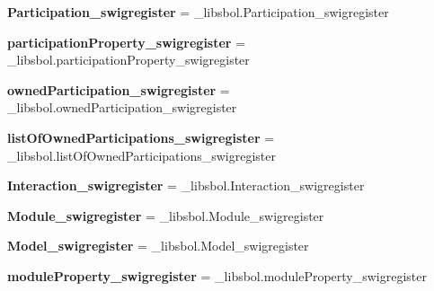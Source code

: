\begin{DoxyCompactItemize}
\item 
{\bfseries Participation\+\_\+swigregister} = \+\_\+libsbol.\+Participation\+\_\+swigregister\hypertarget{namespacesbol_1_1libsbol_adc117255c9c44b1ac337a87ce1a45afb}{}\label{namespacesbol_1_1libsbol_adc117255c9c44b1ac337a87ce1a45afb}

\item 
{\bfseries participation\+Property\+\_\+swigregister} = \+\_\+libsbol.\+participation\+Property\+\_\+swigregister\hypertarget{namespacesbol_1_1libsbol_aba7a86ced827b633feb3ff2c2be8a6bf}{}\label{namespacesbol_1_1libsbol_aba7a86ced827b633feb3ff2c2be8a6bf}

\item 
{\bfseries owned\+Participation\+\_\+swigregister} = \+\_\+libsbol.\+owned\+Participation\+\_\+swigregister\hypertarget{namespacesbol_1_1libsbol_a3a3b7b9f66d317530311d9ea5b96c011}{}\label{namespacesbol_1_1libsbol_a3a3b7b9f66d317530311d9ea5b96c011}

\item 
{\bfseries list\+Of\+Owned\+Participations\+\_\+swigregister} = \+\_\+libsbol.\+list\+Of\+Owned\+Participations\+\_\+swigregister\hypertarget{namespacesbol_1_1libsbol_aa580d9c040d9659045d3f4065330fd37}{}\label{namespacesbol_1_1libsbol_aa580d9c040d9659045d3f4065330fd37}

\item 
{\bfseries Interaction\+\_\+swigregister} = \+\_\+libsbol.\+Interaction\+\_\+swigregister\hypertarget{namespacesbol_1_1libsbol_a7bc91e84cf3086e8faf5b62c637ee742}{}\label{namespacesbol_1_1libsbol_a7bc91e84cf3086e8faf5b62c637ee742}

\item 
{\bfseries Module\+\_\+swigregister} = \+\_\+libsbol.\+Module\+\_\+swigregister\hypertarget{namespacesbol_1_1libsbol_a4ce2679f1565318af3844c0b0d852838}{}\label{namespacesbol_1_1libsbol_a4ce2679f1565318af3844c0b0d852838}

\item 
{\bfseries Model\+\_\+swigregister} = \+\_\+libsbol.\+Model\+\_\+swigregister\hypertarget{namespacesbol_1_1libsbol_ace5334205fc1ee9bc0004487fda7f176}{}\label{namespacesbol_1_1libsbol_ace5334205fc1ee9bc0004487fda7f176}

\item 
{\bfseries module\+Property\+\_\+swigregister} = \+\_\+libsbol.\+module\+Property\+\_\+swigregister\hypertarget{namespacesbol_1_1libsbol_aa514e72ca35ccc89cfce8c3129fd2414}{}\label{namespacesbol_1_1libsbol_aa514e72ca35ccc89cfce8c3129fd2414}


\end{DoxyCompactItemize}

